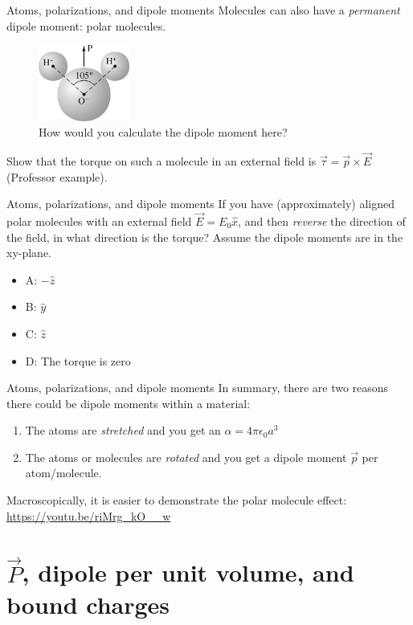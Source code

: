 \documentclass{beamer}
\begin{document}
\begin{frame}{Atoms, polarizations, and dipole moments}
Molecules can also have a \textit{permanent} dipole moment: polar molecules.
\begin{figure}
\centering
\includegraphics[width=3cm]{figures/4_4.jpg}
\caption{\label{fig:water} How would you calculate the dipole moment here?}
\end{figure}
Show that the torque on such a molecule in an external field is $\vec{\tau} = \vec{p} \times \vec{E}$ (Professor example).
\end{frame}

\begin{frame}{Atoms, polarizations, and dipole moments}
If you have (approximately) aligned polar molecules with an external field $\vec{E} = E_0 \hat{x}$, and then \textit{reverse} the direction of the field, in what direction is the torque?  Assume the dipole moments are in the xy-plane.
\begin{itemize}
\item A: $-\hat{z}$
\item B: $\hat{y}$
\item C: $\hat{z}$
\item D: The torque is zero
\end{itemize}
\end{frame}

\begin{frame}{Atoms, polarizations, and dipole moments}
In summary, there are two reasons there could be dipole moments within a material:
\begin{enumerate}
\item The atoms are \textit{stretched} and you get an $\alpha = 4\pi\epsilon_0 a^3$
\item The atoms or molecules are \textit{rotated} and you get a dipole moment $\vec{p}$ per atom/molecule.
\end{enumerate}
Macroscopically, it is easier to demonstrate the polar molecule effect: \url{https://youtu.be/riMrg_kO__w}
\end{frame}

\section{$\vec{P}$, dipole per unit volume, and bound charges}
\end{document}
